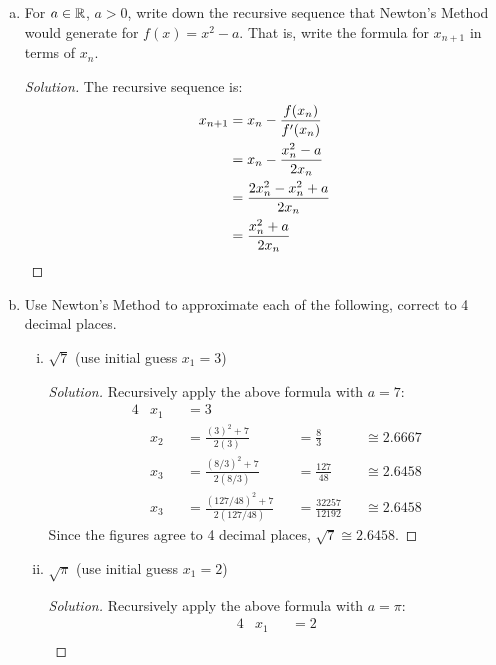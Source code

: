 \question \begin{enumerate}[(a)]
  \item For $a\in\mathbb{R}$, $a > 0$, write down the recursive sequence that Newton's Method would generate for $f(x)=x^2-a$.
        That is, write the formula for $x_{n+1}$ in terms of $x_n$.
        \begin{proof}[Solution]
          The recursive sequence is:
          \begin{align*}
            x_{n+1} & = x_n - \frac{f(x_n)}{f'(x_n)}  \\
                    & = x_n - \frac{x_n^2-a}{2x_n}    \\
                    & = \frac{2x_n^2-x_n^2+a}{2x_n}   \\
                    & = \frac{x_n^2+a}{2x_n} \qedhere
          \end{align*}
        \end{proof}
  \item Use Newton's Method to approximate each of the following, correct to 4 decimal places.
        \begin{enumerate}[(i)]
          \item $\sqrt{7}$ (use initial guess $x_1=3$)
                \begin{proof}[Solution]
                  Recursively apply the above formula with $a=7$:
                  \begin{alignat*}{4}
                     & x_1 &  & = 3                                                                           \\
                     & x_2 &  & = \frac{(3)^2+7}{2(3)}           &  & = \frac83             &  & \cong 2.6667 \\
                     & x_3 &  & = \frac{(8/3)^2+7}{2(8/3)}       &  & = \frac{127}{48}      &  & \cong 2.6458 \\
                     & x_3 &  & = \frac{(127/48)^2+7}{2(127/48)} &  & = \frac{32257}{12192} &  & \cong 2.6458
                  \end{alignat*}
                  Since the figures agree to 4 decimal places, $\sqrt{7} \cong 2.6458$.
                \end{proof}
          \item $\sqrt{\pi}$ (use initial guess $x_1=2$)
                \begin{proof}[Solution]
                  Recursively apply the above formula with $a=\pi$:
                  \begin{alignat*}{4}
                     & x_1                              &  & = 2                                                                                  \\

\end{alignat*}
\end{proof}
\end{enumerate}
\end{enumerate}

